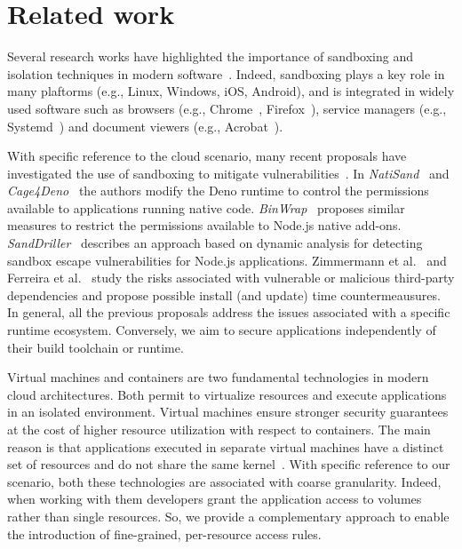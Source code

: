 \section{Related work}
\label{dmng:sect:related-work}

Several research works have highlighted the importance of sandboxing
and isolation techniques in modern software~\cite{kim2013practical,
  lsm_fra, berman1995tron, RLBox, seapp, ALBANESE2020934}. Indeed,
sandboxing plays a key role in many plaftorms (e.g., Linux, Windows,
iOS, Android), and is integrated in widely used software such as
browsers (e.g., Chrome~\cite{chromium-sandbox},
Firefox~\cite{firefox-sandbox}), service managers (e.g.,
Systemd~\cite{systemd-sandbox}) and document viewers (e.g.,
Acrobat~\cite{acrobat-sandbox}).

With specific reference to the cloud scenario, many recent proposals
have investigated the use of sandboxing to mitigate
vulnerabilities~\cite{natisand, cage4deno, enhance-wasm-sandbox,
  sanddriller-staicu, staicu2021bilingual, binwrap, zimmermann-risks,
  npm-malicious-update}. In {\em NatiSand}~\cite{natisand} and {\em
  Cage4Deno}~\cite{cage4deno} the authors modify the Deno runtime to
control the permissions available to applications running native
code. {\em BinWrap}~\cite{binwrap} proposes similar measures to
restrict the permissions available to Node.js native add-ons.  {\em
  SandDriller}~\cite{sanddriller-staicu} describes an approach based
on dynamic analysis for detecting sandbox escape vulnerabilities for
Node.js applications. Zimmermann et al.~\cite{zimmermann-risks} and
Ferreira et al.~\cite{npm-malicious-update} study the risks associated
with vulnerable or malicious third-party dependencies and propose
possible install (and update) time countermeausures. In general, all
the previous proposals address the issues associated with a specific
runtime ecosystem. Conversely, we aim to secure applications
independently of their build toolchain or runtime.

Virtual machines and containers are two fundamental technologies in
modern cloud architectures. Both permit to virtualize resources and
execute applications in an isolated environment. Virtual machines
ensure stronger security guarantees at the cost of higher resource
utilization with respect to containers. The main reason is that
applications executed in separate virtual machines have a distinct set
of resources and do not share the same
kernel~\cite{casola-optimization, CASOLA2018235}.  With specific
reference to our scenario, both these technologies are associated with
coarse granularity. Indeed, when working with them developers grant
the application access to volumes rather than single resources. So, we
provide a complementary approach to enable the introduction of
fine-grained, per-resource access rules.

